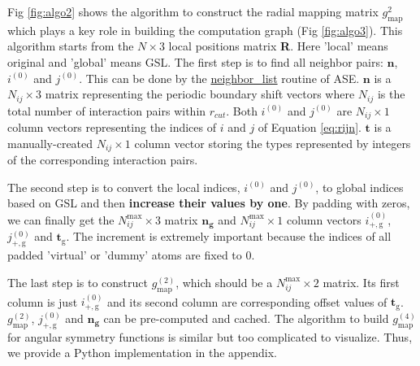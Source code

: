 \documentclass[preprint]{revtex4-2}
\begin{document}
Fig \ref{fig:algo2} shows the algorithm to construct the radial mapping matrix
$g_{\mathrm{map}}^2$ which plays a key role in building the computation graph 
(Fig \ref{fig:algo3}). This algorithm starts from the $N \times 3$ local 
positions matrix \textbf{R}. Here 'local' means original and 'global' means GSL. 
The first step is to find all neighbor pairs: $\mathbf{n}$, $i^{(0)}$ and 
$j^{(0)}$. This can be done by the 
\href{https://wiki.fysik.dtu.dk/ase/ase/neighborlist.html}{neighbor\_list} 
routine of ASE\cite{ase}. $\mathbf{n}$ is a $N_{ij} \times 3$ matrix 
representing the periodic boundary shift vectors where $N_{ij}$ is the total 
number of interaction pairs within $r_{cut}$.
Both $i^{(0)}$ and $j^{(0)}$ are $N_{ij}\times 1$ column vectors representing 
the indices of $i$ and $j$ of Equation \ref{eq:rijn}. 
$\mathbf{t}$ is a manually-created $N_{ij}\times 1$ column vector storing the 
types \textemdash represented by integers \textemdash of the corresponding 
interaction pairs.

The second step is to convert the local indices, $i^{(0)}$ and $j^{(0)}$, to 
global indices based on GSL and then \textbf{increase their values by one}. 
By padding with zeros, we can finally get the $N_{ij}^{\mathrm{max}} \times 3$ 
matrix $\mathbf{n_g}$ and $N_{ij}^{\mathrm{max}} \times 1$ column vectors 
$i^{(0)}_{\mathrm{+,g}}$, $j^{(0)}_{\mathrm{+,g}}$ and 
$\mathbf{t}_{\mathrm{g}}$. The increment is extremely important because the 
indices of all padded 'virtual' or 'dummy' atoms are fixed to 0.

The last step is to construct $g_{\mathrm{map}}^{(2)}$, which should be a 
$N_{ij}^{\mathrm{max}} \times 2$ matrix. Its first column is just 
$i^{(0)}_{\mathrm{+,g}}$ and its second column are corresponding offset values 
of $\mathbf{t}_{\mathrm{g}}$. $g_{\mathrm{map}}^{(2)}$, 
$j^{(0)}_{\mathrm{+,g}}$ and $\mathbf{n_g}$ can be pre-computed and cached. 
The algorithm to build $g_{\mathrm{map}}^{(4)}$ for angular symmetry functions 
is similar but too complicated to visualize. Thus, we provide a Python 
implementation in the appendix. 
\end{document}
